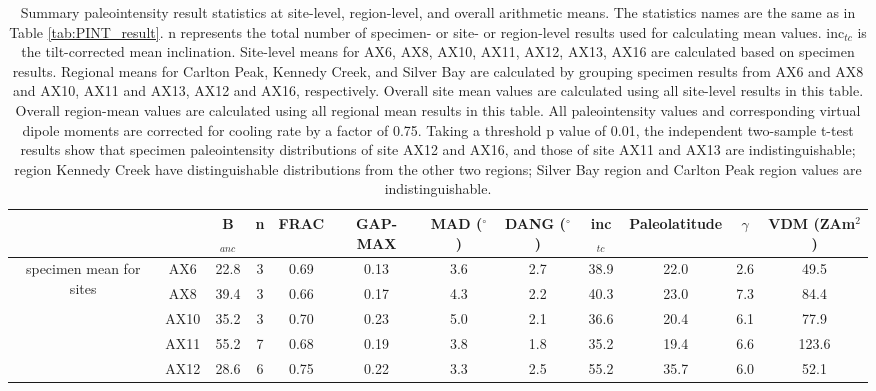 \documentclass[9pt,twoside]{pnas-new}
\begin{document}
\begin{table}[]
\centering
\caption{\footnotesize{Summary paleointensity result statistics at site-level, region-level, and overall arithmetic means. The statistics names are the same as in Table \ref{tab:PINT_result}}. n represents the total number of specimen- or site- or region-level results used for calculating mean values. inc$_{tc}$ is the tilt-corrected mean inclination. Site-level means for AX6, AX8, AX10, AX11, AX12, AX13, AX16 are calculated based on specimen results. Regional means for Carlton Peak, Kennedy Creek, and Silver Bay are calculated by grouping specimen results from AX6 and AX8 and AX10, AX11 and AX13, AX12 and AX16, respectively. Overall site mean values are calculated using all site-level results in this table. Overall region-mean values are calculated using all regional mean results in this table. All paleointensity values and corresponding virtual dipole moments are corrected for cooling rate by a factor of 0.75. Taking a threshold p value of 0.01, the independent two-sample t-test results show that specimen paleointensity distributions of site AX12 and AX16, and those of site AX11 and AX13 are indistinguishable; region Kennedy Creek have distinguishable distributions from the other two regions; Silver Bay region and Carlton Peak region values are indistinguishable.}
\begin{tabular}{cccccccccccc}
                                           &               & B$_{anc}$ & n  & FRAC & GAP-MAX & MAD ($^\circ$) & DANG ($^\circ$) & inc$_{tc}$ & Paleolatitude & $\gamma$ & VDM (ZAm$^2$) \\ \hline
\multirow{7}{*}{specimen mean for sites}   & AX6           & 22.8      & 3  & 0.69 & 0.13    & 3.6            & 2.7             & 38.9       & 22.0          & 2.6      & 49.5          \\
                                           & AX8           & 39.4      & 3  & 0.66 & 0.17    & 4.3            & 2.2             & 40.3       & 23.0          & 7.3      & 84.4          \\
                                           & AX10          & 35.2      & 3  & 0.70 & 0.23    & 5.0            & 2.1             & 36.6       & 20.4          & 6.1      & 77.9          \\
                                           & AX11          & 55.2      & 7  & 0.68 & 0.19    & 3.8            & 1.8             & 35.2       & 19.4          & 6.6      & 123.6         \\
                                           & AX12          & 28.6      & 6  & 0.75 & 0.22    & 3.3            & 2.5             & 55.2       & 35.7          & 6.0      & 52.1          \\

\end{tabular}
\end{table}
\end{document}

